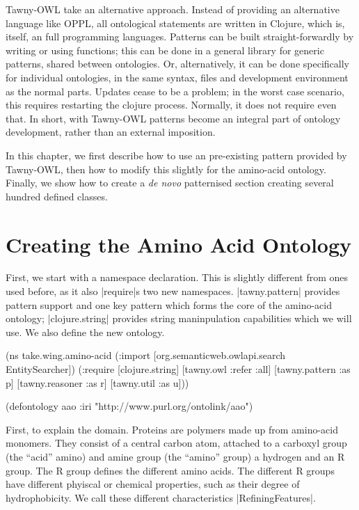 Tawny-OWL take an alternative approach. Instead of providing an
alternative language like OPPL, all ontological statements are written
in Clojure, which is, itself, an full programming languages. Patterns
can be built straight-forwardly by writing or using functions; this
can be done in a general library for generic patterns, shared between
ontologies. Or, alternatively, it can be done specifically for
individual ontologies, in the same syntax, files and development
environment as the normal parts. Updates cease to be a problem; in the
worst case scenario, this requires restarting the clojure
process. Normally, it does not require even that. In short, with
Tawny-OWL patterns become an integral part of ontology development,
rather than an external imposition.

In this chapter, we first describe how to use an pre-existing pattern
provided by Tawny-OWL, then how to modify this slightly for the
amino-acid ontology.  Finally, we show how to create a \textit{de
  novo} patternised section creating several hundred defined classes.

\section{Creating the Amino Acid Ontology}
\label{sec:creating-amino-acid}

First, we start with a namespace declaration. This is slightly different from
ones used before, as it also |require|s two new namespaces. |tawny.pattern|
provides pattern support and one key pattern which forms the core of the
amino-acid ontology; |clojure.string| provides string maninpulation
capabilities which we will use. We also define the new ontology.

\begin{tawny}
(ns take.wing.amino-acid
  (:import [org.semanticweb.owlapi.search EntitySearcher])
  (:require
    [clojure.string]
    [tawny.owl :refer :all]
    [tawny.pattern :as p]
    [tawny.reasoner :as r]
    [tawny.util :as u]))

(defontology aao
  :iri "http://www.purl.org/ontolink/aao")
\end{tawny}

First, to explain the domain. Proteins are polymers made up from amino-acid
monomers. They consist of a central carbon atom, attached to a carboxyl group
(the ``acid'' amino) and amine group (the ``amino'' group) a hydrogen and an R
group. The R group defines the different amino acids. The different R groups
have different phyiscal or chemical properties, such as their degree of
hydrophobicity. We call these different characteristics |RefiningFeatures|.

